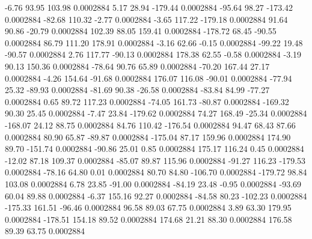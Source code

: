        -6.76       93.95      103.98     0.0002884
        5.17       28.94     -179.44     0.0002884
      -95.64       98.27     -173.42     0.0002884
      -82.68      110.32       -2.77     0.0002884
       -3.65      117.22     -179.18     0.0002884
       91.64       90.86      -20.79     0.0002884
      102.39       88.05      159.41     0.0002884
     -178.72       68.45      -90.55     0.0002884
       86.79      111.20      178.91     0.0002884
       -3.16       62.66       -0.15     0.0002884
      -99.22       19.48      -90.57     0.0002884
        2.76      117.77      -90.13     0.0002884
      178.38       62.55       -0.58     0.0002884
       -3.19       90.13      150.36     0.0002884
      -78.64       90.76       65.89     0.0002884
      -70.20      167.44       27.17     0.0002884
       -4.26      154.64      -91.68     0.0002884
      176.07      116.08      -90.01     0.0002884
      -77.94       25.32      -89.93     0.0002884
      -81.69       90.38      -26.58     0.0002884
      -83.84       84.99      -77.27     0.0002884
        0.65       89.72      117.23     0.0002884
      -74.05      161.73      -80.87     0.0002884
     -169.32       90.30       25.45     0.0002884
       -7.47       23.84     -179.62     0.0002884
       74.27      168.49      -25.34     0.0002884
     -168.07       24.12       88.75     0.0002884
       84.76      110.42     -176.54     0.0002884
       94.47       68.43       87.66     0.0002884
       80.90       65.87      -89.87     0.0002884
     -175.04       87.17      159.96     0.0002884
      174.90       89.70     -151.74     0.0002884
      -90.86       25.01        0.85     0.0002884
      175.17      116.24        0.45     0.0002884
      -12.02       87.18      109.37     0.0002884
      -85.07       89.87      115.96     0.0002884
      -91.27      116.23     -179.53     0.0002884
      -78.16       64.80        0.01     0.0002884
       80.70       84.80     -106.70     0.0002884
     -179.72       98.84      103.08     0.0002884
        6.78       23.85      -91.00     0.0002884
      -84.19       23.48       -0.95     0.0002884
      -93.69       60.04       89.88     0.0002884
       -6.37      155.16       92.27     0.0002884
      -84.58       80.23     -102.23     0.0002884
     -175.33      161.51      -96.46     0.0002884
       96.58       89.03       67.75     0.0002884
        3.89       63.30      179.95     0.0002884
     -178.51      154.18       89.52     0.0002884
      174.68       21.21       88.30     0.0002884
      176.58       89.39       63.75     0.0002884
